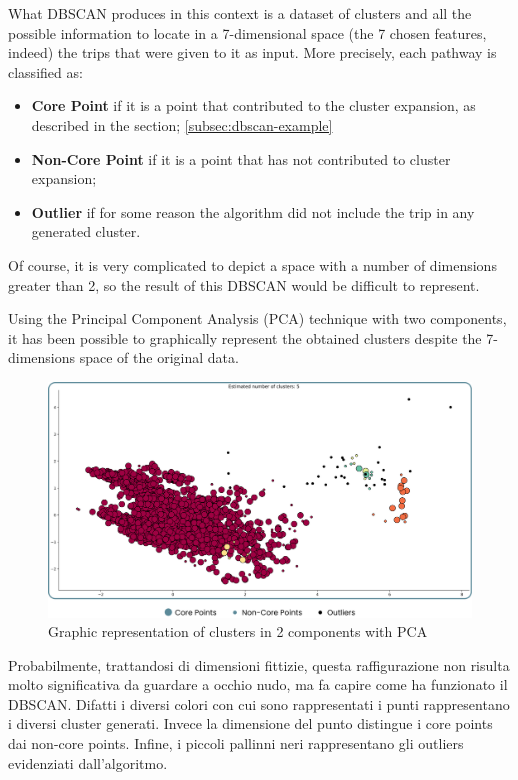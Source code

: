 What DBSCAN produces in this context is a dataset of clusters and all the possible information to locate in a 7-dimensional space (the 7 chosen features, indeed) the trips that were given to it as input.
More precisely, each pathway is classified as:
\begin{itemize}
\item \textbf{Core Point} if it is a point that contributed to the cluster expansion, as described in the section; \ref{subsec:dbscan-example}
\item \textbf{Non-Core Point} if it is a point that has not contributed to cluster expansion;
\item \textbf{Outlier} if for some reason the algorithm did not include the trip in any generated cluster.
\end{itemize}

Of course, it is very complicated to depict a space with a number of dimensions greater than 2, so the result of this DBSCAN would be difficult to represent.

Using the Principal Component Analysis (PCA) technique with two components, it has been possible to graphically represent the obtained clusters despite the 7-dimensions space of the original data.

\begin{figure}[H]
    \centering
    \includegraphics[width=13cm]{Images/3/clusters.png}
    \caption{Graphic representation of clusters in 2 components with PCA}
\end{figure}

Probabilmente, trattandosi di dimensioni fittizie, questa raffigurazione non risulta molto significativa da guardare a occhio nudo, ma fa capire come ha funzionato il DBSCAN. Difatti i diversi colori con cui sono rappresentati i punti rappresentano i diversi cluster generati. Invece la dimensione del punto distingue i core points dai non-core points. Infine, i piccoli pallinni neri rappresentano gli outliers evidenziati dall'algoritmo.

